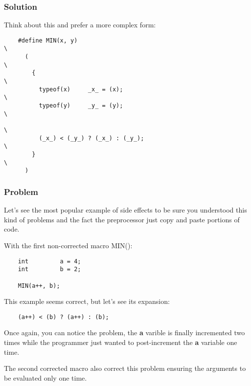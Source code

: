 \documentclass[8pt]{beamer}
\newcommand{\nl}[0]{\vspace{0.4cm}}
\begin{document}

\begin{frame}[containsverbatim]
  \frametitle{Solution}

  Think about this and prefer a more complex form:

  \begin{verbatim}
    #define MIN(x, y)                                                   \
      (                                                                 \
        {                                                               \
          typeof(x)     _x_ = (x);                                      \
          typeof(y)     _y_ = (y);                                      \
                                                                        \
          (_x_) < (_y_) ? (_x_) : (_y_);                                \
        }                                                               \
      )
  \end{verbatim}
\end{frame}


\begin{frame}[containsverbatim]
  \frametitle{Problem}

  Let's see the most popular example of side effects to be sure
  you understood this kind of problems and the fact the preprocessor just copy
  and paste portions of code.

  \nl

  With the first non-corrected macro MIN():

  \begin{verbatim}
    int         a = 4;
    int	        b = 2;

    MIN(a++, b);
  \end{verbatim}

  This example seems correct, but let's see its expansion:

  \begin{verbatim}
    (a++) < (b) ? (a++) : (b);
  \end{verbatim}

  Once again, you can notice the problem, the \textbf{a} varible is finally
  incremented two times while the programmer just wanted to post-increment
  the \textbf{a} variable one time.

  \nl

  The second corrected macro also correct this problem ensuring the arguments
  to be evaluated only one time.
\end{frame}
\end{document}
